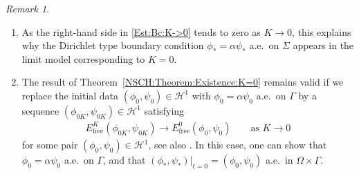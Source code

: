 \documentclass[11pt,reqno]{amsart}
\theoremstyle{remark}
\newtheorem{remark}[theorem]{Remark}
\numberwithin{equation}{section}
\newcommand{\Om}{\Omega}
\newcommand{\Ga}{\Gamma}
\begin{document}
\begin{remark}
\begin{enumerate}[label=\textnormal{(\alph*)},leftmargin=*]
    \item As the right-hand side in \eqref{Est:Bc:K->0} tends to zero as $K\rightarrow 0$, this explains why the Dirichlet type boundary condition $\phi_\ast = \alpha\psi_\ast$ a.e.~on $\Sigma$ appears in the limit model corresponding to $K = 0$. 
	\item The result of Theorem~\ref{NSCH:Theorem:Existence:K=0} remains valid if we replace the initial data $(\phi_0,\psi_0)\in\mathcal{H}^1$ with $\phi_0 = \alpha\psi_0$ a.e.~on $\Ga$ by a sequence $(\phi_{0K},\psi_{0K})\in\mathcal{H}^1$ satisfying
	\begin{align*}
		E_{\mathrm{free}}^K(\phi_{0K},\psi_{0K}) \rightarrow E_{\mathrm{free}}^0(\phi_0,\psi_0) \qquad\text{as~}K\rightarrow 0
	\end{align*}
	for some pair $(\phi_0,\psi_0)\in\mathcal{H}^1$, see also \cite[Theorem~2.3]{Knopf2020}. In this case, one can show that $\phi_0 = \alpha\psi_0$ a.e.~on $\Ga$, and that $(\phi_\ast,\psi_\ast)\vert_{t=0} = (\phi_0,\psi_0)$ a.e.~in $\Om\times\Ga$.
\end{enumerate}
\end{remark}
\end{document}
